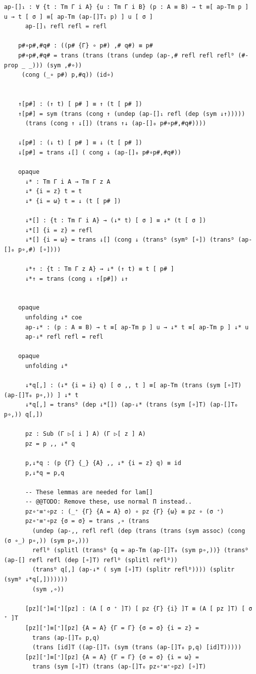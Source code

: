 {\begin{Verbatim}[breaklines=true,breakanywhere=true,fontsize=\scriptsize]
      ap-[]₁ : ∀ {t : Tm Γ i A} {u : Tm Γ i B} (p : A ≡ B) → t ≡[ ap-Tm p ] u → t [ σ ] ≡[ ap-Tm (ap-[]T₁ p) ] u [ σ ]
      ap-[]₁ refl refl = refl

    p#∘p#,#q# : ((p# {Γ} ∘ p#) ,# q#) ≡ p#
    p#∘p#,#q# = trans (trans (trans (undep (ap-,# refl refl reflᴰ (#-prop _ _))) (sym ,#∘))
     (cong (_∘ p#) p,#q)) (id∘)


    ↑[p#] : (↑ t) [ p# ] ≡ ↑ (t [ p# ])
    ↑[p#] = sym (trans (cong ↑ (undep (ap-[]₁ refl (dep (sym ↓↑)))))
      (trans (cong ↑ ↓[]) (trans ↑↓ (ap-[]₀ p#∘p#,#q#))))

    ↓[p#] : (↓ t) [ p# ] ≡ ↓ (t [ p# ])
    ↓[p#] = trans ↓[] ( cong ↓ (ap-[]₀ p#∘p#,#q#))

    opaque
      ↓* : Tm Γ i A → Tm Γ z A
      ↓* {i = z} t = t
      ↓* {i = ω} t = ↓ (t [ p# ])

      ↓*[] : {t : Tm Γ i A} → (↓* t) [ σ ] ≡ ↓* (t [ σ ])
      ↓*[] {i = z} = refl
      ↓*[] {i = ω} = trans ↓[] (cong ↓ (transᴰ (symᴰ [∘]) (transᴰ (ap-[]₀ p∘,#) [∘])))

      ↓*↑ : {t : Tm Γ z A} → ↓* (↑ t) ≡ t [ p# ]
      ↓*↑ = trans (cong ↓ ↑[p#]) ↓↑


    opaque
      unfolding ↓* coe
      ap-↓* : (p : A ≡ B) → t ≡[ ap-Tm p ] u → ↓* t ≡[ ap-Tm p ] ↓* u
      ap-↓* refl refl = refl

    opaque
      unfolding ↓*

      ↓*q[,] : (↓* {i = i} q) [ σ ,, t ] ≡[ ap-Tm (trans (sym [∘]T) (ap-[]T₀ p∘,)) ] ↓* t
      ↓*q[,] = transᴰ (dep ↓*[]) (ap-↓* (trans (sym [∘]T) (ap-[]T₀ p∘,)) q[,])

      pz : Sub (Γ ▷[ i ] A) (Γ ▷[ z ] A)
      pz = p ,, ↓* q

      p,↓*q : (p {Γ} {_} {A} ,, ↓* {i = z} q) ≡ id
      p,↓*q = p,q

      -- These lemmas are needed for lam[]
      -- @@TODO: Remove these, use normal Π instead..
      pz∘⁺≡⁺∘pz : (_⁺ {Γ} {A = A} σ) ∘ pz {Γ} {ω} ≡ pz ∘ (σ ⁺)
      pz∘⁺≡⁺∘pz {σ = σ} = trans ,∘ (trans
        (undep (ap-,, refl refl (dep (trans (trans (sym assoc) (cong (σ ∘_) p∘,)) (sym p∘,)))
        reflᴰ (splitl (transᴰ {q = ap-Tm (ap-[]T₀ (sym p∘,))} (transᴰ (ap-[] refl refl (dep [∘]T) reflᴰ (splitl reflᴰ))
        (transᴰ q[,] (ap-↓* ( sym [∘]T) (splitr reflᴰ)))) (splitr (symᴰ ↓*q[,]))))))
        (sym ,∘))

      [pz][⁺]≡[⁺][pz] : (A [ σ ⁺ ]T) [ pz {Γ} {i} ]T ≡ (A [ pz ]T) [ σ ⁺ ]T
      [pz][⁺]≡[⁺][pz] {A = A} {Γ = Γ} {σ = σ} {i = z} =
        trans (ap-[]T₀ p,q)
        (trans [id]T ((ap-[]T₁ (sym (trans (ap-[]T₀ p,q) [id]T)))))
      [pz][⁺]≡[⁺][pz] {A = A} {Γ = Γ} {σ = σ} {i = ω} =
        trans (sym [∘]T) (trans (ap-[]T₀ pz∘⁺≡⁺∘pz) [∘]T)


\end{Verbatim}}

